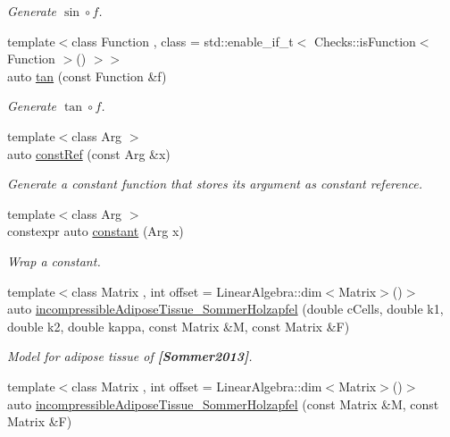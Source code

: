 \begin{DoxyCompactItemize}
\begin{DoxyCompactList}\small\item\em Generate $ \sin\circ f $. \end{DoxyCompactList}\item 
{\footnotesize template$<$class Function , class  = std\+::enable\+\_\+if\+\_\+t$<$ Checks\+::is\+Function$<$ Function $>$() $>$$>$ }\\auto \hyperlink{group__CMathGroup_gae03f57bd4efb4449ad1dc60cb74c742d}{tan} (const Function \&f)
\begin{DoxyCompactList}\small\item\em Generate $ \tan\circ f $. \end{DoxyCompactList}\item 
{\footnotesize template$<$class Arg $>$ }\\auto \hyperlink{namespaceFunG_abcfb38c2e995436816ea884803302f2d}{const\+Ref} (const Arg \&x)
\begin{DoxyCompactList}\small\item\em Generate a constant function that stores its argument as constant reference. \end{DoxyCompactList}\item 
{\footnotesize template$<$class Arg $>$ }\\constexpr auto \hyperlink{namespaceFunG_a939d13d36c194b402715f12a28147cdc}{constant} (Arg x)
\begin{DoxyCompactList}\small\item\em Wrap a constant. \end{DoxyCompactList}\item 
{\footnotesize template$<$class Matrix , int offset = Linear\+Algebra\+::dim$<$\+Matrix$>$()$>$ }\\auto \hyperlink{group__Biomechanics_gac269eefc1abb994044e1634c20a98061}{incompressible\+Adipose\+Tissue\+\_\+\+Sommer\+Holzapfel} (double c\+Cells, double k1, double k2, double kappa, const Matrix \&M, const Matrix \&F)
\begin{DoxyCompactList}\small\item\em Model for adipose tissue of {\bfseries [Sommer2013]}. \end{DoxyCompactList}\item 
{\footnotesize template$<$class Matrix , int offset = Linear\+Algebra\+::dim$<$\+Matrix$>$()$>$ }\\auto \hyperlink{group__Biomechanics_ga01ab128bcf179f4431b0270179af9e20}{incompressible\+Adipose\+Tissue\+\_\+\+Sommer\+Holzapfel} (const Matrix \&M, const Matrix \&F)

\end{DoxyCompactItemize}
